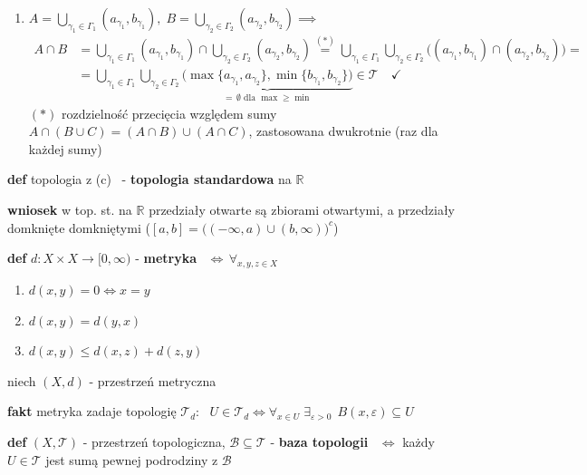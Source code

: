 \documentclass[a4paper,12pt]{article}
\begin{document}
\begin{podpunkty}
\begin{enumerate}[label=\roman*), leftmargin=1.9em, itemsep=0.2em, topsep=0.2em, parsep=0pt, partopsep=0pt]
        \item \(A = \bigcup_{\gamma_1 \in \Gamma_1} (a_{\gamma_1}, b_{\gamma_1}), \; B = \bigcup_{\gamma_2 \in \Gamma_2} (a_{\gamma_2}, b_{\gamma_2}) \implies\)
        \begin{align*}
        A \cap B &= \bigcup_{\gamma_1 \in \Gamma_1} (a_{\gamma_1}, b_{\gamma_1}) \cap \bigcup_{\gamma_2 \in \Gamma_2} (a_{\gamma_2}, b_{\gamma_2}) \overset{(*)}{=} \bigcup_{\gamma_1 \in \Gamma_1} \bigcup_{\gamma_2 \in \Gamma_2} \big((a_{\gamma_1}, b_{\gamma_1}) \cap (a_{\gamma_2}, b_{\gamma_2})\big) = \\
        &= \bigcup_{\gamma_1 \in \Gamma_1} \bigcup_{\gamma_2 \in \Gamma_2} \underbrace{\big(\max\{a_{\gamma_1}, a_{\gamma_2}\}, \min\{b_{\gamma_1}, b_{\gamma_2}\}\big)}_{= \, \emptyset \text{ dla } \max \geq \min} \in \mathcal{T} \quad \checkmark
        \end{align*}
        \((*)\) rozdzielność przecięcia względem sumy \(A \cap (B \cup C) = (A \cap B) \cup (A \cap C)\), zastosowana dwukrotnie (raz dla każdej sumy)
    \end{enumerate}
\end{podpunkty}

\bigskip
\textbf{def} \; topologia z (c) \, - \textbf{topologia standardowa} na \(\mathbb{R}\)

\smallskip
\textbf{wniosek} \; w top. st. na \(\mathbb{R}\) przedziały otwarte są zbiorami otwartymi, a przedziały domknięte domkniętymi (\([a, b] = \big((-\infty, a) \cup (b, \infty)\big)^c\))

\bigskip
\textbf{def} \; \(d: X \times X \to [0, \infty)\) - \textbf{metryka} \, \(\iff \, \forall_{x, y, z \in X}\)
\begin{enumerate}[label=\roman*), leftmargin=1.9em, itemsep=0.2em, topsep=0.2em, parsep=0pt, partopsep=0pt]
    \item \(d(x, y) = 0 \iff x = y\)
    \item \(d(x, y) = d(y, x)\)
    \item \(d(x, y) \leq d(x, z) + d(z, y)\)
\end{enumerate}

\bigskip
niech \((X, d)\) - przestrzeń metryczna

\smallskip
\textbf{fakt} \; metryka zadaje topologię \(\mathcal{T}_d\): \, \(U \in \mathcal{T}_d \iff \forall_{x \in U} \; \exists_{\varepsilon > 0} \;\, B(x, \varepsilon) \subseteq U\)

\bigskip
\textbf{def} \; \((X, \mathcal{T})\) - przestrzeń topologiczna, \; \(\mathcal{B} \subseteq \mathcal{T}\) - \textbf{baza topologii} \, \(\iff\) każdy \(U \in \mathcal{T}\) jest sumą pewnej podrodziny z \(\mathcal{B}\)
\end{document}
